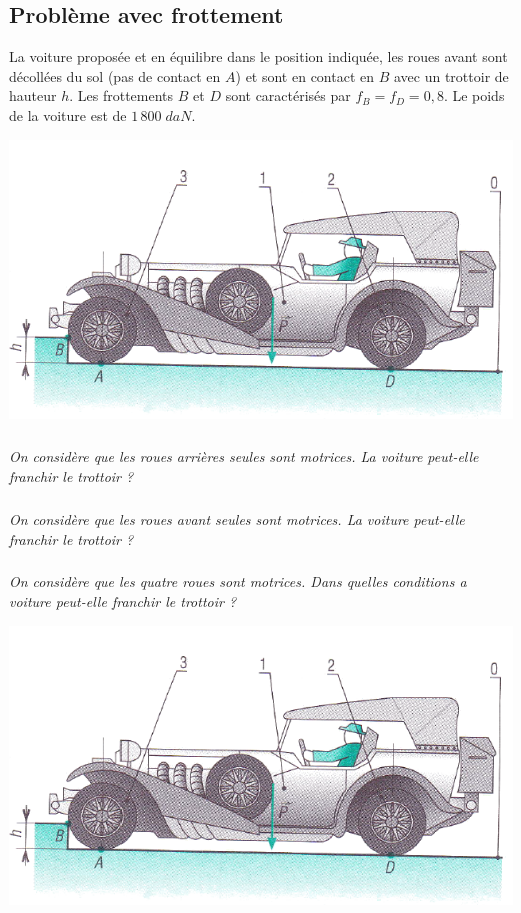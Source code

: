 \documentclass[10pt]{article}
\begin{document}
\subsection*{Problème avec frottement}

La voiture proposée et en équilibre dans le position indiquée, les roues avant sont décollées du sol (pas de contact en $A$) et sont en contact en $B$ avec un trottoir de hauteur $h$. Les frottements $B$ et $D$ sont caractérisés par $f_B = f_D = 0,8$. Le poids de la voiture est de $1\,800\; daN$. 

\begin{center}
\includegraphics[width=.8\textwidth]{images/voiture}
\end{center}

 \subparagraph{}
\textit{On considère que les roues arrières seules sont motrices. La voiture peut-elle franchir le trottoir ?}


 \subparagraph{}
\textit{On considère que les roues avant seules sont motrices. La voiture peut-elle franchir le trottoir ?}


 \subparagraph{}
\textit{On considère que les quatre roues sont motrices. Dans quelles conditions a voiture peut-elle franchir le trottoir ?}

\begin{center}
\includegraphics[width=.75\textwidth]{images/voiture}
\end{center}
\end{document}
